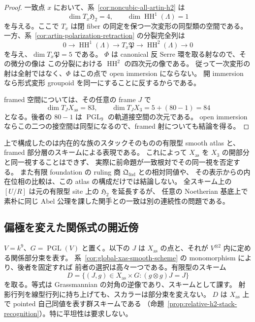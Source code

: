 \begin{proof}
一致点 $x$ において、系~\ref{cor:noncubic-all-artin-h2} は
\[
 \dim T_x\mathfrak H_2=4,\qquad
 \dim\operatorname{HH}^1(\Lambda)=1
\]
を与える。ここで $T_x$ は閉 fiber の同定を保つ一次変形の同型類の空間である。
一方、系~\ref{cor:artin-polarization-retraction} の分裂完全列は
\[
 0\longrightarrow\operatorname{HH}^1(\Lambda)
 \longrightarrow T_x\mathfrak P
 \longrightarrow\operatorname{HH}^2(\Lambda)\longrightarrow0
\]
を与え、$\dim T_x\mathfrak P=5$ である。
$\Phi$ は canonical 反 Serre 環を取る射なので、その微分の像は
この分裂における $\operatorname{HH}^2$ の四次元の像である。
従って一次変形の射は全射ではなく、$\Phi$ はこの点で open immersion にならない。
開 immersion なら形式変形 groupoid を同一にすることに反するからである。

framed 空間については、その任意の frame $J$ で
\[
 \dim T_JX_{\mathrm{as}}=83,\qquad
 \dim T_JX_3=5+(80-1)=84
\]
となる。後者の $80-1$ は $\operatorname{PGL}_9$ の軌道接空間の次元である。
open immersion ならこの二つの接空間は同型になるので、framed 射についても結論を得る。
\end{proof}

\begin{remark}[表現可能性から自動的には出ない比較]
上で構成したのは内在的な族のスタックそのものの有限型 smooth atlas と、
framed 部分層のスキームによる表現である。
これによって $X_{\mathrm{as}}$ を $X_3$ の開部分と同一視することはできず、
実際に前命題が一致根対でその同一視を否定する。
また有限 foundation の ruling 商 $\mathfrak Q_{\mathrm{fnd}}$ との相対同値や、
その表示からの内在位相の比較は、この atlas の構成だけでは結論しない。
全スキーム上の $[U/R]$ は元の有限型 site 上の $\mathfrak H_2$ を延長するが、
任意の Noetherian 基底上で素朴に同じ Abel 公理を課した関手との一致は別の連続性の問題である。
\end{remark}

\subsection{偏極を変えた関係式の開近傍}
\label{subsec:twisted-polarization-neighborhood}

$V=k^9$、$G=\operatorname{PGL}(V)$ と置く。以下の $J$ は
$X_{\mathrm{as}}$ の点と、それが $V^{\otimes2}$ 内に定める関係部分束を表す。
系~\ref{cor:global-xas-smooth-scheme} の monomorphism により、後者を固定すれば
前者の選択は高々一つである。有限型のスキーム
\[
 D=\{(J,g)\in X_{\mathrm{as}}\times G:
                      (g\otimes g)J=J\}
\]
を取る。等式は Grassmannian の対角の逆像であり、スキームとして課す。
射影行列を線型行列に持ち上げても、スカラーは部分束を変えない。
$D$ は $X_{\mathrm{as}}$ 上で pointed 自己同値を表す群スキームである
（命題~\ref{prop:relative-h2-stack-recognition}）。特に平坦性は要求しない。

